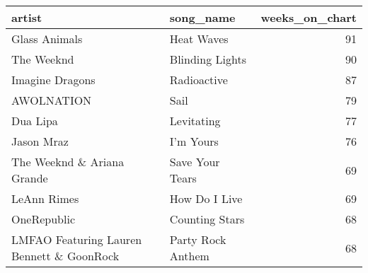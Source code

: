 \begin{tabular}{llr}
\toprule
                                   artist &         song\_name &  weeks\_on\_chart \\
\midrule
                            Glass Animals &        Heat Waves &              91 \\
                               The Weeknd &   Blinding Lights &              90 \\
                          Imagine Dragons &       Radioactive &              87 \\
                               AWOLNATION &              Sail &              79 \\
                                 Dua Lipa &        Levitating &              77 \\
                               Jason Mraz &         I'm Yours &              76 \\
               The Weeknd \& Ariana Grande &   Save Your Tears &              69 \\
                              LeAnn Rimes &     How Do I Live &              69 \\
                              OneRepublic &    Counting Stars &              68 \\
LMFAO Featuring Lauren Bennett \& GoonRock & Party Rock Anthem &              68 \\
\bottomrule
\end{tabular}
